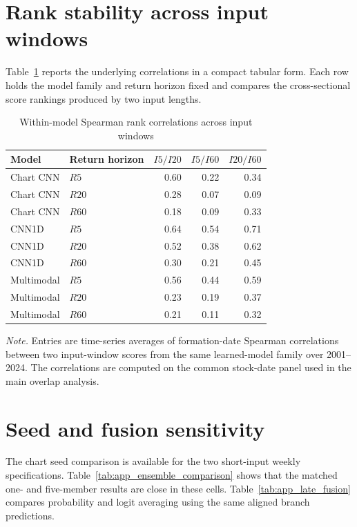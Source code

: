 \section{Rank stability across input windows}\label{app:rank_stability}

Table~\ref{tab:app_rank_stability} reports the underlying correlations in a compact tabular form. Each row holds the model family and return horizon fixed and compares the cross-sectional score rankings produced by two input lengths.

\begin{table}[htbp]
\centering
\caption{Within-model Spearman rank correlations across input windows}
\label{tab:app_rank_stability}
\small
\setlength{\tabcolsep}{9pt}
\begin{tabular}{@{}llrrr@{}}
\toprule
Model & Return horizon & $I5/I20$ & $I5/I60$ & $I20/I60$ \\
\midrule
Chart CNN & $R5$  & 0.60 & 0.22 & 0.34 \\
Chart CNN & $R20$ & 0.28 & 0.07 & 0.09 \\
Chart CNN & $R60$ & 0.18 & 0.09 & 0.33 \\
\addlinespace[2pt]
CNN1D & $R5$  & 0.64 & 0.54 & 0.71 \\
CNN1D & $R20$ & 0.52 & 0.38 & 0.62 \\
CNN1D & $R60$ & 0.30 & 0.21 & 0.45 \\
\addlinespace[2pt]
Multimodal & $R5$  & 0.56 & 0.44 & 0.59 \\
Multimodal & $R20$ & 0.23 & 0.19 & 0.37 \\
Multimodal & $R60$ & 0.21 & 0.11 & 0.32 \\
\bottomrule
\end{tabular}
\begin{minipage}{\textwidth}
\footnotesize\textit{Note.} Entries are time-series averages of formation-date Spearman correlations between two input-window scores from the same learned-model family over 2001--2024. The correlations are computed on the common stock-date panel used in the main overlap analysis.
\end{minipage}
\end{table}

\FloatBarrier

\section{Seed and fusion sensitivity}\label{app:sensitivity}

The chart seed comparison is available for the two short-input weekly specifications. Table~\ref{tab:app_ensemble_comparison} shows that the matched one- and five-member results are close in these cells. Table~\ref{tab:app_late_fusion} compares probability and logit averaging using the same aligned branch predictions.

